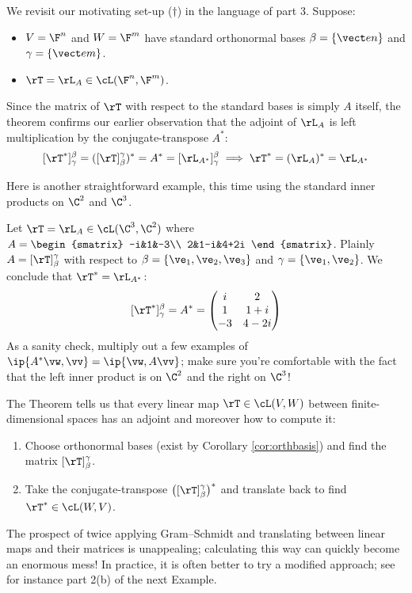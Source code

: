 We revisit our motivating set-up ($\dag$) in the language of part 3. Suppose:
\begin{itemize}
  \item $V=\F^n$ and $W=\F^m$ have standard orthonormal bases $\beta=\{\vect en\}$ and $\gamma=\{\vect em\}$.
  \item $\rT=\rL_A\in\cL(\F^n,\F^m)$. 
\end{itemize} Since the matrix of $\rT$ with respect to the standard bases is simply $A$ itself, the theorem confirms our earlier observation that the adjoint of $\rL_A$ is left multiplication by the conjugate-transpose $A^*$:
\[[\rT^*]_\gamma^\beta=([\rT]_\beta^\gamma)^*=A^*=[\rL_{A^*}]_\gamma^\beta\implies \rT^*=(\rL_A)^*=\rL_{A^*}\]

Here is another straightforward example, this time using the standard inner products on $\C^2$ and $\C^3$.
 
\begin{example}{}{}
Let $\rT=\rL_A\in\cL(\C^3,\C^2)$ where $A=\begin{smatrix}
  -i&1&-3\\
  2&1-i&4+2i
\end{smatrix}$.\smallbreak
Plainly $A=[\rT]_\beta^\gamma$ with respect to $\beta=\{\ve_1,\ve_2,\ve_3\}$ and $\gamma=\{\ve_1,\ve_2\}$. We conclude that $\rT^*=\rL_{A^*}$:
  \[[\rT^*]_\gamma^\beta=A^*=\begin{pmatrix}
  i&2\\
  1&1+i\\
  -3&4-2i
  \end{pmatrix}\]
  As a sanity check, multiply out a few examples of $\ip{A^*\vw,\vv}=\ip{\vw,A\vv}$; make sure you're comfortable with the fact that the left inner product is on $\C^2$ and the right on $\C^3$!
\end{example}

The Theorem tells us that every linear map $\rT\in\cL(V,W)$ between finite-dimensional spaces has an adjoint and moreover how to compute it:
\begin{enumerate} 
  \item Choose orthonormal bases (exist by Corollary \ref{cor:orthbasis}) and find the matrix $[\rT]_\beta^\gamma$.
  \item Take the conjugate-transpose $\bigl([\rT]_\beta^\gamma\bigr)^*$ and translate back to find $\rT^*\in\cL(W,V)$.
\end{enumerate}
The prospect of twice applying Gram--Schmidt and translating between linear maps and their matrices is unappealing; calculating this way can quickly become an enormous mess! In practice, it is often better to try a modified approach; see for instance part 2(b) of the next Example.
\goodbreak



